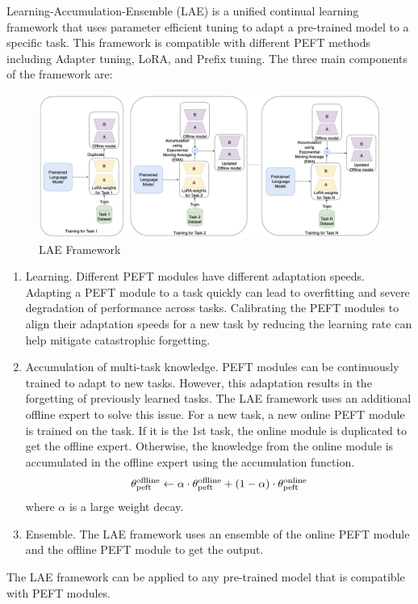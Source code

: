 Learning-Accumulation-Ensemble (LAE) \cite{gao2023unified} is a unified continual learning framework that uses parameter efficient tuning to adapt a pre-trained model to a specific task. This framework is compatible with different PEFT methods including Adapter tuning, LoRA, and Prefix tuning. The three main components of the framework are:
\begin{figure}[h]
    \centering
    \includegraphics[width=1\textwidth]{Figures/literature_review/LAE.jpeg} 
    \caption{LAE Framework}
    \label{fig:LAE}
\end{figure}
\begin{enumerate}
\item Learning. Different PEFT modules have different adaptation speeds. Adapting a PEFT module to a task quickly can lead to overfitting and severe degradation of performance across tasks. Calibrating the PEFT modules to align their adaptation speeds for a new task by reducing the learning rate can help mitigate catastrophic forgetting.
\item Accumulation of multi-task knowledge. PEFT modules can be continuously trained to adapt to new tasks. However, this adaptation results in the forgetting of previously learned tasks. The LAE framework uses an additional offline expert to solve this issue. For a new task, a new online PEFT module is trained on the task. If it is the 1st task, the online module is duplicated to get the offline expert. Otherwise, the knowledge from the online module is accumulated in the offline expert using the accumulation function. 
\begin{equation}
\centering
\theta_{\text{peft}}^{\text{offline}} \leftarrow \alpha \cdot \theta_{\text{peft}}^{\text{offline}} + (1 - \alpha) \cdot \theta_{\text{peft}}^{\text{online}}
\end{equation}
where \(\alpha\) is a large weight decay.
\item Ensemble. The LAE framework uses an ensemble of the online PEFT module and the offline PEFT module to get the output.
\end{enumerate}
The LAE framework can be applied to any pre-trained model that is compatible with PEFT modules. 

